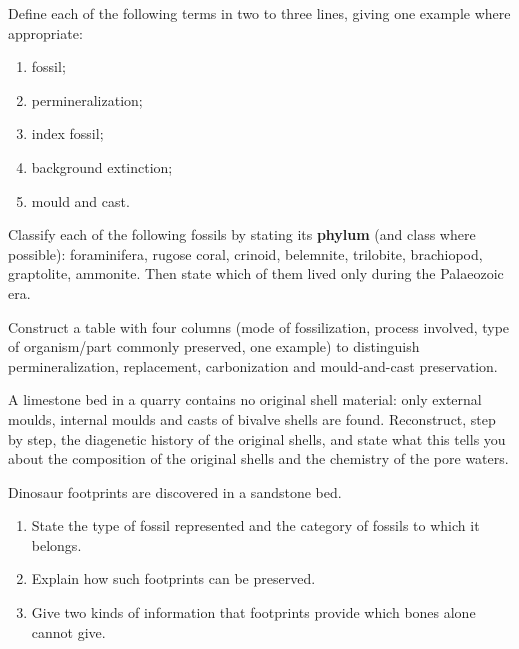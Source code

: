 \documentclass[11pt]{article}
\newcommand{\cle}[1]{{\popxbold\color{popdark}#1}}
\newcounter{popsec}
\newcounter{popsub}
\newcommand{\courssub}[1]{%
  \stepcounter{popsub}%
  \par\vspace{9pt}\noindent{\popxbold\fontsize{11.5}{13}\selectfont\color{popink}{\color{poporange}\thepopsec.\thepopsub}\hspace{6pt}#1}\par\nopagebreak\vspace{4pt}
}
\begin{document}
\begin{exercice}[Definitions]
Define each of the following terms in two to three lines, giving one example where appropriate:
\begin{enumerate}
\item fossil;
\item permineralization;
\item index fossil;
\item background extinction;
\item mould and cast.
\end{enumerate}
\end{exercice}

\begin{exercice}
Classify each of the following fossils by stating its \textbf{phylum} (and class where possible): foraminifera, rugose coral, crinoid, belemnite, trilobite, brachiopod, graptolite, ammonite. Then state which of them lived only during the Palaeozoic era.
\end{exercice}

\courssub{I practise}

\begin{exercice}
Construct a table with four columns (mode of fossilization, process involved, type of organism/part commonly preserved, one example) to distinguish \cle{permineralization}, \cle{replacement}, \cle{carbonization} and \cle{mould-and-cast} preservation.
\end{exercice}

\begin{exercice}
A limestone bed in a quarry contains no original shell material: only external moulds, internal moulds and casts of bivalve shells are found. Reconstruct, step by step, the diagenetic history of the original shells, and state what this tells you about the composition of the original shells and the chemistry of the pore waters.
\end{exercice}

\begin{exercice}
Dinosaur footprints are discovered in a sandstone bed.
\begin{enumerate}
\item State the type of fossil represented and the category of fossils to which it belongs.
\item Explain how such footprints can be preserved.
\item Give two kinds of information that footprints provide which bones alone cannot give.
\end{enumerate}
\end{exercice}
\end{document}
